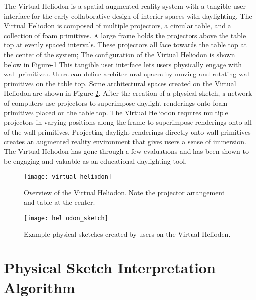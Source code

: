 	The Virtual Heliodon is a spatial augmented reality system with a tangible user interface for the early collaborative design of interior spaces with daylighting\cite{sheng2009virtual, cutler2009inferring,nasman2013physical,nasman2013evaluation,cutler2010interpreting}. 
	The Virtual Heliodon is composed of multiple projectors, a circular table, and a collection of foam primitives.  
	A large frame holds the projectors above the table top at evenly spaced intervals. 
	These projectors all face towards the table top at the center of the system;
	The configuration of the Virtual Heliodon is shown below in Figure-\ref{fig:virtual_heliodon}
	This tangible user interface lets users physically engage with wall primitives. 
	Users can define architectural spaces by moving and rotating wall primitives on the table top.
	Some architectural spaces created on the Virtual Heliodon are shown in Figure-\ref{fig:heliodon_sketch}.
	After the creation of a physical sketch, a network of computers use projectors to superimpose daylight renderings onto foam primitives placed on the table top.
	The Virtual Heliodon requires multiple projectors in varying positions along the frame to superimpose renderings onto all of the wall primitives.
	Projecting daylight renderings directly onto wall primitives creates an augmented reality environment that gives users a sense of immersion\cite{nasman2013evaluation}.
	The Virtual Heliodon has gone through a few evaluations and has been shown to be engaging and valuable as an educational daylighting tool\cite{nasman2013evaluation}.

	\begin{figure}[h]
	\centering
	\caption[Overiew of the Virtual Heliodon.]{Overview of the Virtual Heliodon. Note the projector arrangement and table at the center.}
	\label{fig:virtual_heliodon}
	\texttt{[image: virtual\_heliodon]}
	\end{figure}

	\begin{figure}[h]
	\centering
	\caption{Example physical sketches created by users on the Virtual Heliodon.}
	\label{fig:heliodon_sketch}
	\texttt{[image: heliodon\_sketch]}
	\end{figure}

\section{Physical Sketch Interpretation Algorithm}

